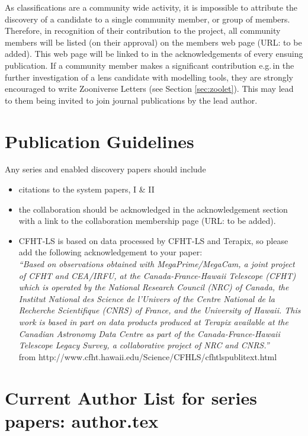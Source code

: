 \documentclass[a4paper]{article}
\begin{document}
As \sw classifications are a community wide activity, it is impossible to attribute the discovery of a candidate to a single community member, or group  of members. Therefore, in recognition of their contribution to the \sw project, all \sw community members will be listed (on their approval) on the \sw members web page (URL: to be added). This web page will be linked to in the acknowledgements of every ensuing \sw publication. If a community member makes a significant contribution e.g.\,in the further investigation of a lens candidate with modelling tools, they are strongly encouraged to write Zooniverse Letters (see Section \ref{sec:zoolet}). This may lead to them being invited to join journal publications by the lead author.  



\section{Publication Guidelines}
\label{sec:publ}

Any \sw series and \sw enabled discovery papers should include
\begin{itemize}
\item citations to the \sw system papers, \sw I \& II
\item the collaboration should be acknowledged in the acknowledgement section with a link to the collaboration membership page (URL: to be added).
\item \sw CFHT-LS is based on data processed by CFHT-LS and Terapix, so please add the following acknowledgement to your paper:\\
\textit{``Based on observations obtained with MegaPrime/MegaCam, a joint project of CFHT and CEA/IRFU, at the Canada-France-Hawaii Telescope (CFHT) which is operated by the National Research Council (NRC) of Canada, the Institut National des Science de l'Univers of the Centre National de la Recherche Scientifique (CNRS) of France, and the University of Hawaii. This work is based in part on data products produced at Terapix available at the Canadian Astronomy Data Centre as part of the Canada-France-Hawaii Telescope Legacy Survey, a collaborative project of NRC and CNRS.''}\\
from http://www.cfht.hawaii.edu/Science/CFHLS/cfhtlspublitext.html

\end{itemize}


\appendix
\section{Current Author List for \sw series papers: author.tex}
\label{sec:appa}
{\small }

\end{document}
